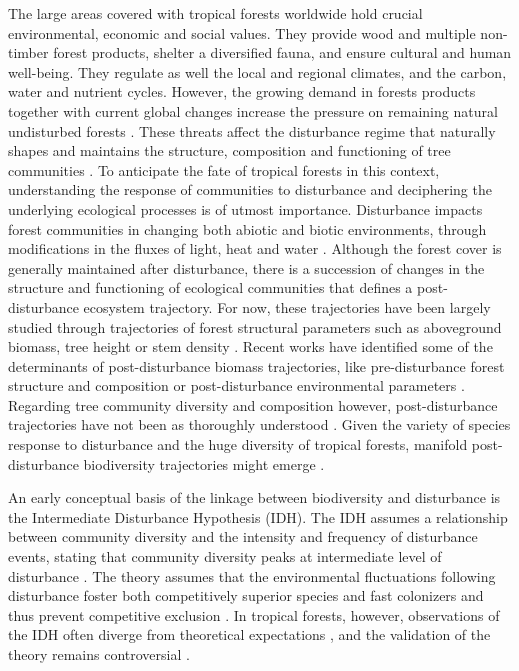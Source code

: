 \documentclass[fleqn,10pt]{ArtEcoFoG} %
\begin{document}
The large areas covered with tropical forests worldwide hold crucial
environmental, economic and social values. They provide wood and
multiple non-timber forest products, shelter a diversified fauna, and
ensure cultural and human well-being. They regulate as well the local
and regional climates, and the carbon, water and nutrient cycles.
However, the growing demand in forests products together with current
global changes increase the pressure on remaining natural undisturbed
forests \citep{Morales-Hidalgo2015}. These threats affect the
disturbance regime that naturally shapes and maintains the structure,
composition and functioning of tree communities
\citep{Schnitzer2001, Anderson-Teixeira2013, Sist2015}. To anticipate
the fate of tropical forests in this context, understanding the response
of communities to disturbance and deciphering the underlying ecological
processes is of utmost importance. Disturbance impacts forest
communities in changing both abiotic and biotic environments, through
modifications in the fluxes of light, heat and water
\citep{Goulamoussene2017}. Although the forest cover is generally
maintained after disturbance, there is a succession of changes in the
structure and functioning of ecological communities that defines a
post-disturbance ecosystem trajectory. For now, these trajectories have
been largely studied through trajectories of forest structural
parameters such as aboveground biomass, tree height or stem density
\citep{Piponiot2016, Rutishauser2016}. Recent works have identified some
of the determinants of post-disturbance biomass trajectories, like
pre-disturbance forest structure and composition or post-disturbance
environmental parameters \citep{Herault2018}. Regarding tree community
diversity and composition however, post-disturbance trajectories have
not been as thoroughly understood \citep{Guitet2018, Molino2001}. Given
the variety of species response to disturbance and the huge diversity of
tropical forests, manifold post-disturbance biodiversity trajectories
might emerge \citep{Lindenmayer2012, Garcia_florez2017}.

An early conceptual basis of the linkage between biodiversity and
disturbance is the Intermediate Disturbance Hypothesis (IDH). The IDH
assumes a relationship between community diversity and the intensity and
frequency of disturbance events, stating that community diversity peaks
at intermediate level of disturbance \citep{Connell1978}. The theory
assumes that the environmental fluctuations following disturbance foster
both competitively superior species and fast colonizers and thus prevent
competitive exclusion \citep{Shea2004, Pulsford2016}. In tropical
forests, however, observations of the IDH often diverge from theoretical
expectations \citep{Hugues2007, Sheil2003, Norden2017}, and the
validation of the theory remains controversial
\citep{Hubbell2001, Fox2013, Sheil2013}.
\end{document}
